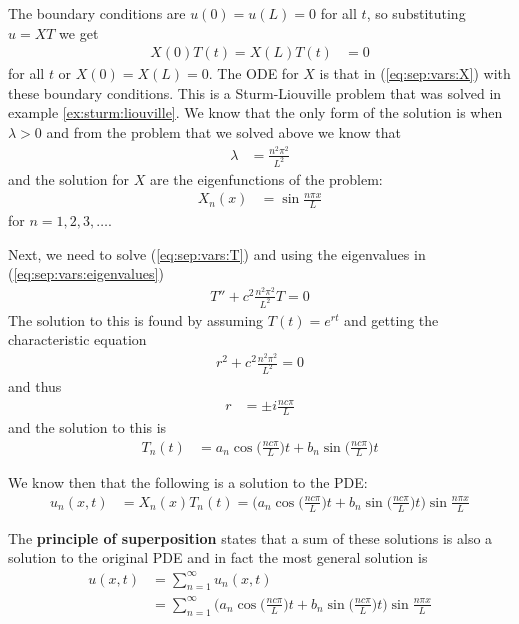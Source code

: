 The boundary conditions are $u(0) = u(L) = 0$ for all $t$, so substituting $u=XT$ we get
%
\begin{align*}
X(0)T(t) = X(L) T(t) & = 0
\end{align*}
for all $t$ or $X(0)=X(L)=0$.  The ODE for $X$ is that in (\ref{eq:sep:vars:X}) with these boundary conditions.  This is a Sturm-Liouville problem that was solved in example \ref{ex:sturm:liouville}.   We know that the only form of the solution is when $\lambda>0$ and from the problem that we solved above we know that
%
\begin{align} \label{eq:sep:vars:eigenvalues}
\lambda & = \frac{n^2 \pi^2}{L^2}
\end{align}
and the solution for $X$ are the eigenfunctions of the problem:
%
\begin{align*}
X_n(x) & = \sin \frac{n \pi x}{L}
\end{align*}
for $n=1,2,3,\ldots$.

Next, we need to solve (\ref{eq:sep:vars:T}) and using the eigenvalues in (\ref{eq:sep:vars:eigenvalues})
%
\begin{align*}
T'' + c^2 \frac{n^2 \pi^2}{L^2} T = 0
\end{align*}
The solution to this is found by assuming $T(t) = e^{r t}$ and getting the characteristic equation
%
\begin{align*}
r^2 + c^2 \frac{n^2 \pi^2}{L^2} = 0
\end{align*}
and thus
%
\begin{align*}
r & = \pm i \frac{n c \pi}{L}
\end{align*}
and the solution to this is
%
\begin{align*}
T_n(t) & = a_n \cos \biggl( \frac{n c \pi }{L} \biggr) t + b_n \sin \biggl( \frac{n c \pi }{L} \biggr) t
\end{align*}

We know then that the following is a solution to the PDE:
%
\begin{align*}
u_n(x,t) & = X_n(x) T_n(t) = \biggl( a_n \cos \biggl( \frac{n c \pi }{L} \biggr) t + b_n \sin \biggl( \frac{n c \pi }{L} \biggr) t \biggr) \sin \frac{n \pi x}{L}
\end{align*}

The \textbf{principle of superposition} states that a sum of these solutions is also a solution to the original PDE and in fact the most general solution is
%
\begin{align*}
u(x,t) & = \sum_{n=1}^{\infty} u_n(x,t) \\
& = \sum_{n=1}^{\infty} \biggl( a_n \cos \biggl( \frac{n c \pi }{L} \biggr) t + b_n \sin \biggl( \frac{n c \pi }{L} \biggr) t \biggr) \sin \frac{n \pi x}{L}
\end{align*}


